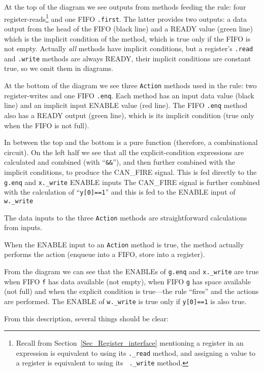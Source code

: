 At the top of the diagram we see outputs from methods feeding the
rule: four register-reads\footnote{Recall from
Section~\ref{Sec_Register_interface} mentioning a register in an
expression is equivalent to using its {\tt .\_read} method, and
assigning a value to a register is equivalent to using its {\tt
.\_write} method.} and one FIFO \verb|.first|.  The latter provides
two outputs: a data output from the head of the FIFO (black line) and
a READY value (green line) which is the implicit condition of the
method, which is true only if the FIFO is not empty.  Actually
\emph{all} methods have implicit conditions, but a register's
\verb|.read| and \verb|.write| methods are always READY, {\ie} their
implicit conditions are constant true, so we omit them in diagrams.

At the bottom of the diagram we see three \verb|Action| methods used
in the rule: two register-writes and one FIFO \verb|.enq|.  Each
method has an input data value (black line) and an implicit input
ENABLE value (red line).  The FIFO \verb|.enq| method also has a READY
output (green line), which is its implicit condition (true only when
the FIFO is not full).

In between the top and the bottom is a pure function (therefore, a
combinational circuit).  On the left half we see that all the
explicit-condition expressions are calculated and combined (with
``\verb|&&|''), and then further combined with the implicit
conditions, to produce the CAN\_FIRE signal.  This is fed directly to
the \verb|g.enq| and \verb|x._write| ENABLE inputs The CAN\_FIRE
signal is further combined with the calculation of ``\verb|y[0]==1|''
and this is fed to the ENABLE input of \verb|w._write|

The data inputs to the three \verb|Action| methods are straightforward
calculations from inputs.

When the ENABLE input to an \verb|Action| method is true, the method
actually performs the action (enqueue into a FIFO, store into a
register).

From the diagram we can see that the ENABLEs of \verb|g.enq| and
\verb|x._write| are true when FIFO \verb|f| has data available (not
empty), when FIFO \verb|g| has space available (not full) and when the
explicit condition is true---the rule ``fires'' and the actions are
performed.  The ENABLE of \verb|w._write| is true only if
\verb|y[0]==1| is also true.

From this description, several things should be clear:

